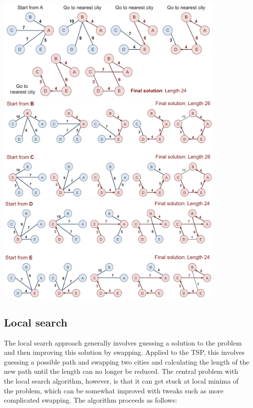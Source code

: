 \begin{center}\includegraphics[width=0.85\textwidth]{img/approximation/TspGreedy1.png}\includegraphics[width=0.85\textwidth]{img/approximation/TspGreedy2.png}\includegraphics[width=0.85\textwidth]{img/approximation/TspGreedy3.png}\end{center}

%

\subsection{Local search}

The local search approach generally involves guessing a solution to the problem and then improving this solution by swapping. Applied to the TSP, this involves guessing a possible path and swapping two cities and calculating the length of the new path until the length can no longer be reduced. The central problem with the local search algorithm, however, is that it can get stuck at local minima of the problem, which can be somewhat improved with tweaks such as more complicated swapping. The algorithm proceeds as follows:

